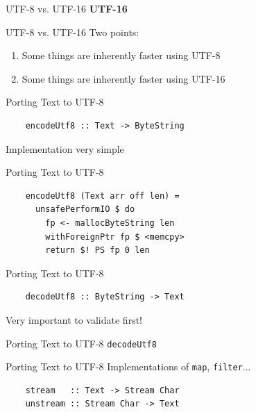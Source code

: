 \documentclass[20pt]{beamer}
\newcommand{\vspaced}{
    \vspace{5mm}
}
\begin{document}
\begin{frame}{UTF-8 vs. UTF-16}
    \textbf{UTF-16} \\
    \vspaced
\end{frame}

\begin{frame}{UTF-8 vs. UTF-16}
    Two points:
    \begin{enumerate}
    \item Some things are inherently faster using UTF-8
    \item Some things are inherently faster using UTF-16
    \end{enumerate}
\end{frame}


\begin{frame}[fragile]{Porting Text to UTF-8}
    \begin{lstlisting}
    encodeUtf8 :: Text -> ByteString
    \end{lstlisting}
    \vspaced
    Implementation very simple
\end{frame}

\begin{frame}[fragile]{Porting Text to UTF-8}
    \begin{lstlisting}
    encodeUtf8 (Text arr off len) =
      unsafePerformIO $ do
        fp <- mallocByteString len
        withForeignPtr fp $ <memcpy>
        return $! PS fp 0 len
    \end{lstlisting}
\end{frame}

\begin{frame}[fragile]{Porting Text to UTF-8}
    \begin{lstlisting}
    decodeUtf8 :: ByteString -> Text
    \end{lstlisting}
    \vspaced
    Very important to validate first!
\end{frame}

\begin{frame}{Porting Text to UTF-8}
    \texttt{decodeUtf8}
\end{frame}

\begin{frame}[fragile]{Porting Text to UTF-8}
    Implementations of \texttt{map}, \texttt{filter}...
    \vspaced
    \begin{lstlisting}
    stream   :: Text -> Stream Char
    unstream :: Stream Char -> Text
    \end{lstlisting}
\end{frame}
\end{document}
